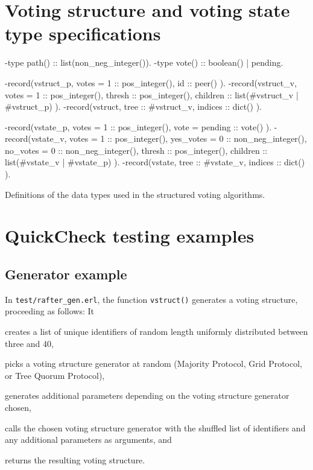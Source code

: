 \documentclass[11pt,chapterprefix=true,toc=bibliography,numbers=noendperiod,
               footnotes=multiple,twoside]{scrreprt}
\begin{document}
\newpage

\section{Voting structure and voting state type specifications\label{sc:voting-types}}

\begin{listing}[h]
    \begin{erlangcode}
-type path() :: list(non_neg_integer()).
-type vote() :: boolean() | pending.

-record(vstruct_p, {
          votes = 1 :: pos_integer(),
          id :: peer()
}).
-record(vstruct_v, {
          votes = 1 :: pos_integer(),
          thresh :: pos_integer(),
          children :: list(#vstruct_v{} | #vstruct_p{})
}).
-record(vstruct, {
          tree :: #vstruct_v{},
          indices :: dict()
}).

-record(vstate_p, {
          votes = 1 :: pos_integer(),
          vote = pending :: vote()
}).
-record(vstate_v, {
          votes = 1 :: pos_integer(),
          yes_votes = 0 :: non_neg_integer(),
          no_votes = 0 :: non_neg_integer(),
          thresh :: pos_integer(),
          children :: list(#vstate_v{} | #vstate_p{})
}).
-record(vstate, {
          tree :: #vstate_v{},
          indices :: dict()
}).
    \end{erlangcode}
    \caption{Definitions of the data types used in the structured voting algorithms.}
    \label{lst:voting-types}
\end{listing}

\section{QuickCheck testing examples\label{sc:testing-examples}}

\subsection{Generator example\label{ssc:generator}}

In \texttt{test/rafter\_gen.erl}, the function \texttt{vstruct()} generates a voting structure, proceeding as follows: It
\begin{inparaenum}[(a)]
    \item creates a list of unique identifiers of random length uniformly distributed between three and 40,
    \item picks a voting structure generator at random (Majority Protocol, Grid Protocol, or Tree Quorum Protocol),
    \item generates additional parameters depending on the voting structure generator chosen,
    \item calls the chosen voting structure generator with the shuffled list of identifiers and any additional parameters as arguments, and
    \item returns the resulting voting structure.
\end{inparaenum}
\end{document}
